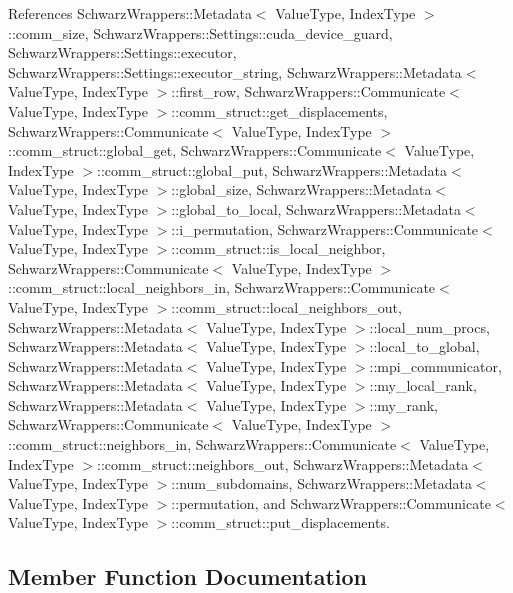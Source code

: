 References Schwarz\+Wrappers\+::\+Metadata$<$ Value\+Type, Index\+Type $>$\+::comm\+\_\+size, Schwarz\+Wrappers\+::\+Settings\+::cuda\+\_\+device\+\_\+guard, Schwarz\+Wrappers\+::\+Settings\+::executor, Schwarz\+Wrappers\+::\+Settings\+::executor\+\_\+string, Schwarz\+Wrappers\+::\+Metadata$<$ Value\+Type, Index\+Type $>$\+::first\+\_\+row, Schwarz\+Wrappers\+::\+Communicate$<$ Value\+Type, Index\+Type $>$\+::comm\+\_\+struct\+::get\+\_\+displacements, Schwarz\+Wrappers\+::\+Communicate$<$ Value\+Type, Index\+Type $>$\+::comm\+\_\+struct\+::global\+\_\+get, Schwarz\+Wrappers\+::\+Communicate$<$ Value\+Type, Index\+Type $>$\+::comm\+\_\+struct\+::global\+\_\+put, Schwarz\+Wrappers\+::\+Metadata$<$ Value\+Type, Index\+Type $>$\+::global\+\_\+size, Schwarz\+Wrappers\+::\+Metadata$<$ Value\+Type, Index\+Type $>$\+::global\+\_\+to\+\_\+local, Schwarz\+Wrappers\+::\+Metadata$<$ Value\+Type, Index\+Type $>$\+::i\+\_\+permutation, Schwarz\+Wrappers\+::\+Communicate$<$ Value\+Type, Index\+Type $>$\+::comm\+\_\+struct\+::is\+\_\+local\+\_\+neighbor, Schwarz\+Wrappers\+::\+Communicate$<$ Value\+Type, Index\+Type $>$\+::comm\+\_\+struct\+::local\+\_\+neighbors\+\_\+in, Schwarz\+Wrappers\+::\+Communicate$<$ Value\+Type, Index\+Type $>$\+::comm\+\_\+struct\+::local\+\_\+neighbors\+\_\+out, Schwarz\+Wrappers\+::\+Metadata$<$ Value\+Type, Index\+Type $>$\+::local\+\_\+num\+\_\+procs, Schwarz\+Wrappers\+::\+Metadata$<$ Value\+Type, Index\+Type $>$\+::local\+\_\+to\+\_\+global, Schwarz\+Wrappers\+::\+Metadata$<$ Value\+Type, Index\+Type $>$\+::mpi\+\_\+communicator, Schwarz\+Wrappers\+::\+Metadata$<$ Value\+Type, Index\+Type $>$\+::my\+\_\+local\+\_\+rank, Schwarz\+Wrappers\+::\+Metadata$<$ Value\+Type, Index\+Type $>$\+::my\+\_\+rank, Schwarz\+Wrappers\+::\+Communicate$<$ Value\+Type, Index\+Type $>$\+::comm\+\_\+struct\+::neighbors\+\_\+in, Schwarz\+Wrappers\+::\+Communicate$<$ Value\+Type, Index\+Type $>$\+::comm\+\_\+struct\+::neighbors\+\_\+out, Schwarz\+Wrappers\+::\+Metadata$<$ Value\+Type, Index\+Type $>$\+::num\+\_\+subdomains, Schwarz\+Wrappers\+::\+Metadata$<$ Value\+Type, Index\+Type $>$\+::permutation, and Schwarz\+Wrappers\+::\+Communicate$<$ Value\+Type, Index\+Type $>$\+::comm\+\_\+struct\+::put\+\_\+displacements.



\subsection{Member Function Documentation}
\mbox{\label{classSchwarzWrappers_1_1SchwarzBase_a7f738c1b03eba45f57cf72bb123febd8}} 

